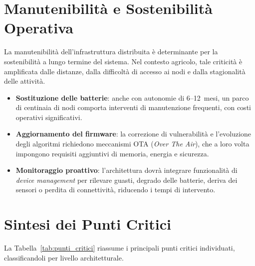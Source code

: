\section{Manutenibilità e Sostenibilità Operativa}

La manutenibilità dell'infrastruttura distribuita è determinante per la sostenibilità a lungo termine del sistema. Nel contesto agricolo, tale criticità è amplificata dalle distanze, dalla difficoltà di accesso ai nodi e dalla stagionalità delle attività.

\begin{itemize}
	\item \textbf{Sostituzione delle batterie}: anche con autonomie di 6--12~mesi, un parco di centinaia di nodi comporta interventi di manutenzione frequenti, con costi operativi significativi.
	
	\item \textbf{Aggiornamento del firmware}: la correzione di vulnerabilità e l'evoluzione degli algoritmi richiedono meccanismi OTA (\textit{Over The Air}), che a loro volta impongono requisiti aggiuntivi di memoria, energia e sicurezza.
	
	\item \textbf{Monitoraggio proattivo}: l'architettura dovrà integrare funzionalità di \textit{device management} per rilevare guasti, degrado delle batterie, deriva dei sensori o perdita di connettività, riducendo i tempi di intervento.
\end{itemize}


\section*{Sintesi dei Punti Critici}

La Tabella~\ref{tab:punti_critici} riassume i principali punti critici individuati, classificandoli per livello architetturale.

